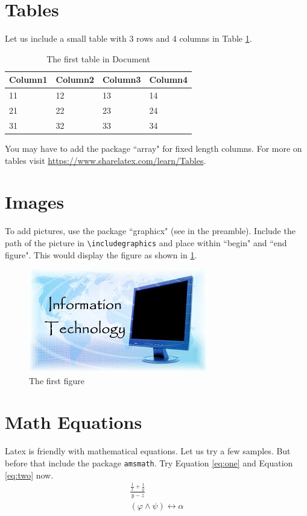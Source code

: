 \documentclass[a4paper,10pt]{article}
\begin{document}
\section{Tables}
Let us include a small table with 3 rows and 4 columns in Table \ref{tab:one}.
\begin{table}[h]
\begin{center}
\caption{The first table in Document}
\label{tab:one}
\begin{tabular}{|l| m{2 cm} |l|l|}
\hline
\textbf{Column1} & \textbf{Column2} & \textbf{Column3} & \textbf{Column4} \\
\hline
11 &12&13&14 \\
\hline
21&22&23&24\\
\hline
31&32&33&34\\
\hline
\end{tabular}
\end{center}
\end{table}
You may have to add the package ``array" for fixed length columns. For more on tables visit \url{https://www.sharelatex.com/learn/Tables}.
\section{Images}
To add pictures, use the package ``graphicx" (see in the preamble). Include the path of the picture in \texttt{\textbackslash includegraphics} and place within ``begin" and ``end figure". This would display  the figure as shown in \ref{fig:one}.
\begin{figure}[h]
\centering
\includegraphics[width = 4 cm, height = 2 cm]{images/it}
\caption{The first figure}
\label{fig:one}
\end{figure}
\section{Math Equations}
Latex is friendly with mathematical equations. Let us try a few samples. But before that include the package \texttt{amsmath}.  Try  Equation \ref{eq:one} and Equation \ref{eq:two} now.
\begin{eqnarray}
\label{eq:one}
\frac{\frac{1}{x}+\frac{1}{y}}{y-z} \\ 
\label{eq:two}
(\varphi \wedge \psi)\leftrightarrow \alpha
\end{eqnarray}
\end{document}
